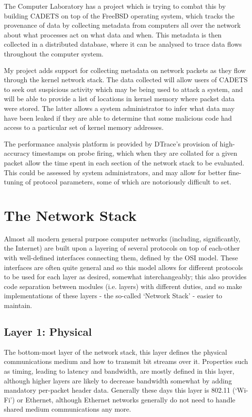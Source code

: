 \documentclass[a4paper,12pt,twoside,openright]{report}
\begin{document}
	The Computer Laboratory has a project which is trying to combat this by building CADETS\cite{CADETS-main} on top of the FreeBSD operating system, which tracks the provenance of data by collecting metadata from computers all over the network about what processes act on what data and when. This metadata is then collected in a distributed database, where it can be analysed to trace data flows throughout the computer system.
	
	My project adds support for collecting metadata on network packets as they flow through the kernel	network stack. The data collected will allow users of CADETS to seek out suspicious activity which may be being used to attack a system, and will be able to provide a list of locations in kernel memory where packet data were stored. The latter allows a system administrator to infer what data may have been leaked if they are able to determine that some malicious code had access to a particular set of kernel memory addresses.
	
	The performance analysis platform is provided by DTrace's provision of high-accuracy timestamps on probe firing, which when they are collated for a given packet allow the time spent in each section of the network stack to be evaluated. This could be assessed by system administrators, and may allow for better fine-tuning of protocol parameters, some of which are notoriously difficult to set.
	
	\section{The Network Stack}
	
	Almost all modern general purpose computer networks (including, significantly, the Internet) are built upon a layering of several protocols on top of each-other with well-defined interfaces connecting them, defined by the OSI model\cite{ISO-OSI}. These interfaces are often quite general and so this model allows for different protocols to be used for each layer as desired, somewhat interchangeably; this also provides code separation between modules (i.e. layers) with different duties, and so make implementations of these layers - the so-called `Network Stack' - easier to maintain.
	
	\subsection{Layer 1: Physical}
	The bottom-most layer of the network stack, this layer defines the physical communications medium and how to transmit bit streams over it. Properties such as timing, leading to latency and bandwidth, are mostly defined in this layer, although higher layers are likely to decrease bandwidth somewhat by adding mandatory per-packet header data. Generally these days this layer is 802.11 (`Wi-Fi') or Ethernet, although Ethernet networks generally do not need to handle shared medium communications any more.
	
\end{document}
